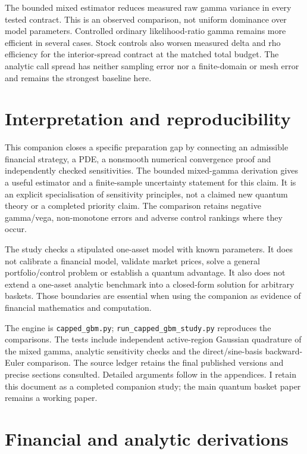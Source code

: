 \documentclass[11pt]{article}
\begin{document}
The bounded mixed estimator reduces measured raw gamma variance in every
tested contract. This is an observed comparison, not uniform dominance
over model parameters. Controlled ordinary likelihood-ratio gamma remains
more efficient in several cases. Stock controls also worsen measured
delta and rho efficiency for the interior-spread contract at the matched
total budget. The analytic call spread has neither sampling error nor a
finite-domain or mesh error and remains the strongest baseline here.

\section{Interpretation and reproducibility}

This companion closes a specific preparation gap by connecting an
admissible financial strategy, a PDE, a nonsmooth numerical convergence
proof and independently checked sensitivities. The bounded mixed-gamma
derivation gives a useful estimator and a finite-sample uncertainty
statement for this claim. It is an explicit specialisation of sensitivity
principles, not a claimed new quantum theory or a completed priority claim.
The comparison retains negative gamma/vega, non-monotone errors and
adverse control rankings where they occur.

The study checks a stipulated one-asset model with known parameters. It
does not calibrate a financial model, validate market prices, solve a
general portfolio/control problem or establish a quantum advantage.
It also does not extend a one-asset analytic benchmark into a closed-form
solution for arbitrary baskets. Those boundaries are essential when
using the companion as evidence of financial mathematics and computation.

The engine is \texttt{capped\_gbm.py};
\texttt{run\_capped\_gbm\_study.py} reproduces the comparisons.
The tests include independent active-region Gaussian quadrature of the
mixed gamma, analytic sensitivity checks and the direct/sine-basis
backward-Euler comparison. The source ledger retains the final published
versions and precise sections consulted. Detailed arguments follow in
the appendices. I retain this document as a completed companion study;
the main quantum basket paper remains a working paper.

\appendix


\section{Financial and analytic derivations}
\label{app:cgbm-financial}
\end{document}
